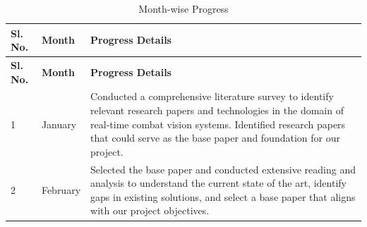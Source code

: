 \renewcommand{\arraystretch}{1.5}
\begin{center}
    \begin{longtable}{
        |>{\centering\arraybackslash}m{1.22cm}
        |>{\raggedright\arraybackslash}m{2.5cm}
        |>{\raggedright\arraybackslash}m{10.1cm}|
        }

        \caption{Month-wise Progress}                                                                                                                                                                                                                                                                                                                    \\

        \hline
        \textbf{Sl. No.} & \textbf{Month} & \textbf{Progress Details}                                                                                                                                                                                                                                                                                    \\
        \hline
        \endfirsthead

        \hline
        \textbf{Sl. No.} & \textbf{Month} & \textbf{Progress Details}                                                                                                                                                                                                                                                                                    \\
        \hline
        \endhead
        \endlastfoot

        1                &
        January          &
        Conducted a comprehensive literature survey to identify relevant research papers and technologies in the domain of real-time combat vision systems. Identified research papers that could serve as the base paper and foundation for our project.                                                                                                \\
        \hline

        2                &
        February         &
        Selected the base paper and conducted extensive reading and analysis to understand the current state of the art, identify gaps in existing solutions, and select a base paper that aligns with our project objectives.                                                                                                                           \\
        \hline


\end{longtable}
\end{center}
